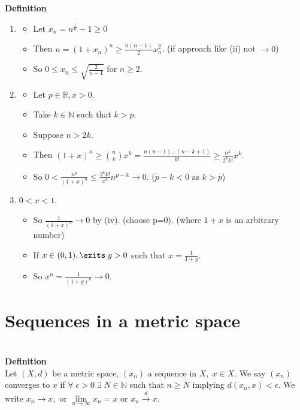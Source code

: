 \documentclass[12pt]{article}
\begin{document}
\begin{block}{\bf Definition}
\begin{enumerate}[label=(\roman*)]
    \item 
    \begin{itemize}
        \item Let $x_n = n^{\frac{1}{n}} -1 \ge 0$
        \item Then $n = (1+x_n)^n \ge \frac{n(n-1)}{2}x_n^2$.
        \hfill (if approach like (ii) not $\to 0$)
        \item So $0 \le x_n \le \sqrt{\frac{2}{n-1}}$ for $n\ge 2$.
    \end{itemize}
    
    
    \item 
    \begin{itemize}
        \item Let $p \in \mathbb{R}, x>0$.
        \item Take $k \in \mathbb{N}$ such that $k > p$.
        \item Suppose $n > 2k$.
        \item Then $(1+x)^n \ge \binom{n}k x^k = \frac{n(n-1)\ldots(n-k+1)}{k!} \ge \frac{n^k}{2^k k!} x^k.$
        \item So $0< \frac{n^p}{(1+x)^n} \le \frac{2^k k!}{x^k} n^{p-k} \rightarrow 0$. 
        \hfill ($p-k<0$ as $k>p$)
    \end{itemize}
    
    
    \item $0<x<1$.
    \begin{itemize}
        \item So $\frac{1}{(1+x)^n} \rightarrow 0$ by (iv). (choose p=0).
        \hfill (where $1+x$ is an arbitrary number)
        \item If $x \in (0,1), \exits\; y>0$ such that $x = \frac{1}{1+y}$.
        \item So $x^n = \frac{1}{(1+y)^n} \rightarrow 0$.
    \end{itemize}
\end{enumerate}

\newpage
\section{Sequences in a metric space}\\
\textbf{Definition}\\
Let $(X,d)$ be a metric space, $(x_n)$ a sequence in $X,\; x \in X$. We say $(x_n)$ converges to $x$ if $\forall\;\epsilon > 0\; \exists\;N\in \mathbb{N}$ such that  $n\ge N$ implying $d(x_n,x) < \epsilon$. We write $x_n \rightarrow x,$ or $\lim\limits_{n\rightarrow \infty} x_n = x$ or $x_n\xrightarrow{d}x$.


\end{block}
\end{document}
